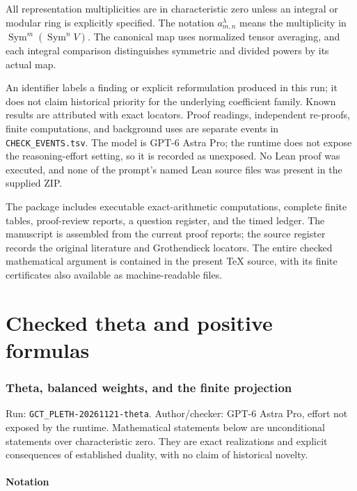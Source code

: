 \documentclass[
  10pt,
]{article}
\begin{document}
All representation multiplicities are in characteristic zero unless an
integral or modular ring is explicitly specified. The notation
\(a_{m,n}^{\lambda}\) means the multiplicity in
\(\operatorname{Sym}^m(\operatorname{Sym}^n V)\). The canonical map uses
normalized tensor averaging, and each integral comparison distinguishes
symmetric and divided powers by its actual map.

An identifier labels a finding or explicit reformulation produced in
this run; it does not claim historical priority for the underlying
coefficient family. Known results are attributed with exact locators.
Proof readings, independent re-proofs, finite computations, and
background uses are separate events in
\texttt{\small CHECK\_\allowbreak{}EVENTS.tsv}. The model is GPT-6 Astra
Pro; the runtime does not expose the reasoning-effort setting, so it is
recorded as unexposed. No Lean proof was executed, and none of the
prompt's named Lean source files was present in the supplied ZIP.

The package includes executable exact-arithmetic computations, complete
finite tables, proof-review reports, a question register, and the timed
ledger. The manuscript is assembled from the current proof reports; the
source register records the original literature and Grothendieck
locators. The entire checked mathematical argument is contained in the
present TeX source, with its finite certificates also available as
machine-readable files.

\part{Checked theta and positive formulas}

\section{Theta, balanced weights, and the finite
projection}\label{theta-balanced-weights-and-the-finite-projection}

Run:
\texttt{\small GCT\_\allowbreak{}PLETH-\allowbreak{}20261121-\allowbreak{}theta}.
Author/checker: GPT-6 Astra Pro, effort not exposed by the runtime.
Mathematical statements below are unconditional statements over
characteristic zero. They are exact realizations and explicit
consequences of established duality, with no claim of historical
novelty.

\subsection{Notation}\label{notation}
\end{document}
